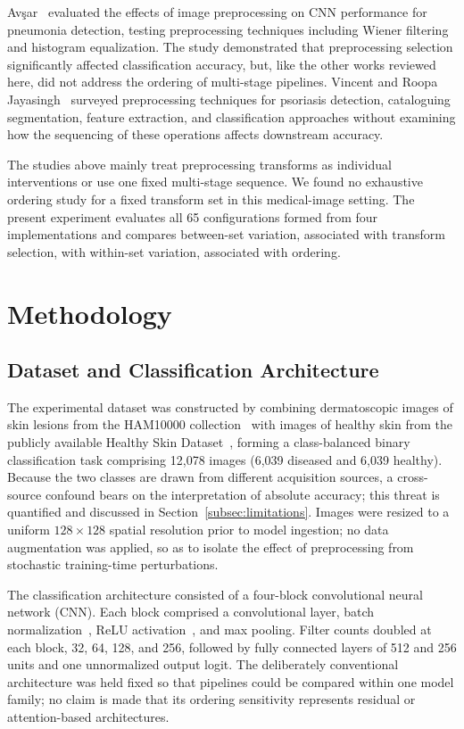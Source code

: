 \documentclass[preprint,review,12pt]{elsarticle}
\begin{document}
Av\c{s}ar~\cite{9548351} evaluated the effects of image preprocessing on CNN performance for pneumonia detection, testing preprocessing techniques including Wiener filtering and histogram equalization. The study demonstrated that preprocessing selection significantly affected classification accuracy, but, like the other works reviewed here, did not address the ordering of multi-stage pipelines. Vincent and Roopa Jayasingh~\cite{9780692} surveyed preprocessing techniques for psoriasis detection, cataloguing segmentation, feature extraction, and classification approaches without examining how the sequencing of these operations affects downstream accuracy.

The studies above mainly treat preprocessing transforms as individual interventions or use one fixed multi-stage sequence. We found no exhaustive ordering study for a fixed transform set in this medical-image setting. The present experiment evaluates all 65 configurations formed from four implementations and compares between-set variation, associated with transform selection, with within-set variation, associated with ordering.


\section{Methodology}
\label{sec:methods}

\subsection{Dataset and Classification Architecture}
\label{subsec:dataset}

The experimental dataset was constructed by combining dermatoscopic images of skin lesions from the HAM10000 collection~\cite{Tschandl2018, Codella2019} with images of healthy skin from the publicly available Healthy Skin Dataset~\cite{megpaulson_healthy_skin}, forming a class-balanced binary classification task comprising 12{,}078 images (6{,}039 diseased and 6{,}039 healthy). Because the two classes are drawn from different acquisition sources, a cross-source confound bears on the interpretation of absolute accuracy; this threat is quantified and discussed in Section~\ref{subsec:limitations}. Images were resized to a uniform $128 \times 128$ spatial resolution prior to model ingestion; no data augmentation was applied, so as to isolate the effect of preprocessing from stochastic training-time perturbations.

The classification architecture consisted of a four-block convolutional neural network (CNN). Each block comprised a convolutional layer, batch normalization~\cite{IoffeSzegedy2015}, ReLU activation~\cite{NairHinton2010}, and max pooling. Filter counts doubled at each block, 32, 64, 128, and 256, followed by fully connected layers of 512 and 256 units and one unnormalized output logit. The deliberately conventional architecture was held fixed so that pipelines could be compared within one model family; no claim is made that its ordering sensitivity represents residual or attention-based architectures.
\end{document}
